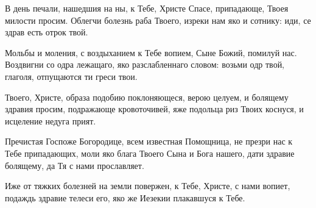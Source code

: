 

\label{_content_obolyachih}

 

\begin{mymulticols}
 






\normalfont{}В день печали, нашедшия на ны, к Тебе, Христе Спасе, припадающе, Твоея милости просим. Облегчи болезнь раба Твоего, изреки нам яко и сотнику: иди, се здрав есть отрок твой.


\normalfont{}Мольбы и моления, с воздыханием к Тебе вопием, Сыне Божий, помилуй нас. Воздвигни со одра лежащаго, яко разслабленнаго словом: возьми одр твой, глаголя, отпущаются ти греси твои.

\slava

Твоего, Христе, образа подобию поклоняющеся, верою целуем, и болящему здравия просим, подражающе кровоточивей, яже подольца риз Твоих коснуся, и исцеление недуга прият.

\inyne

Пречистая Госпоже Богородице, всем известная Помощница, не презри нас к Тебе припадающих, моли яко блага Твоего Сына и Бога нашего, дати здравие болящему, да Тя с нами прославляет.






Иже от тяжких болезней на земли повержен, к Тебе, Христе, с нами вопиет, подаждь здравие телеси его, яко же Иезекии плакавшуся к Тебе.



\end{mymulticols}
